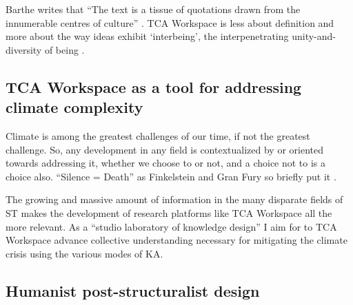 Barthe writes that “The text is a tissue of quotations drawn from the innumerable centres of culture” \citep[p. 146]{barthes_image_1977}. TCA Workspace is less about definition and more about the way ideas exhibit ‘interbeing’, the interpenetrating unity-and-diversity of being \citep[p. 80]{nhat_hanh_world_2008}. 

\subsection{TCA Workspace as a tool for addressing climate complexity}

Climate is among the greatest challenges of our time, if not the greatest challenge. So, any development in any field is contextualized by or oriented towards addressing it, whether we choose to or not, and a choice not to is a choice also. “Silence = Death” as Finkelstein and Gran Fury so briefly put it \citep{finkelstein_after_2018}. 

The growing and massive amount of information in the many disparate fields of ST \citep{grin_transitions_2011} makes the development of research platforms like TCA Workspace all the more relevant. As a “studio laboratory of knowledge design” \citep[p. 197]{drucker_graphesis_2014} I aim for to TCA Workspace advance collective understanding necessary for mitigating the climate crisis using the various modes of KA. 


\subsection{Humanist post-structuralist design}

